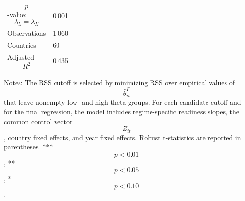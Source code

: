 \begin{table}[H]
\begin{threeparttable}
\begin{tabularx}{\textwidth}{lY}
$$p$$-value: $$\lambda_L=\lambda_H$$ & 0.001 \\
Observations & 1,060 \\
Countries & 60 \\
Adjusted $$R^2$$ & 0.435 \\
\bottomrule
\end{tabularx}
\begin{tablenotes}[flushleft]\footnotesize
\item Notes: The RSS cutoff is selected by minimizing RSS over empirical values of $$\widehat{\theta}^{F}_{it}$$ that leave nonempty low- and high-theta groups. For each candidate cutoff and for the final regression, the model includes regime-specific readiness slopes, the common control vector $$Z_{it}$$, country fixed effects, and year fixed effects. Robust t-statistics are reported in parentheses. *** $$p<0.01$$, ** $$p<0.05$$, * $$p<0.10$$.
\end{tablenotes}
\end{threeparttable}
\end{table}
